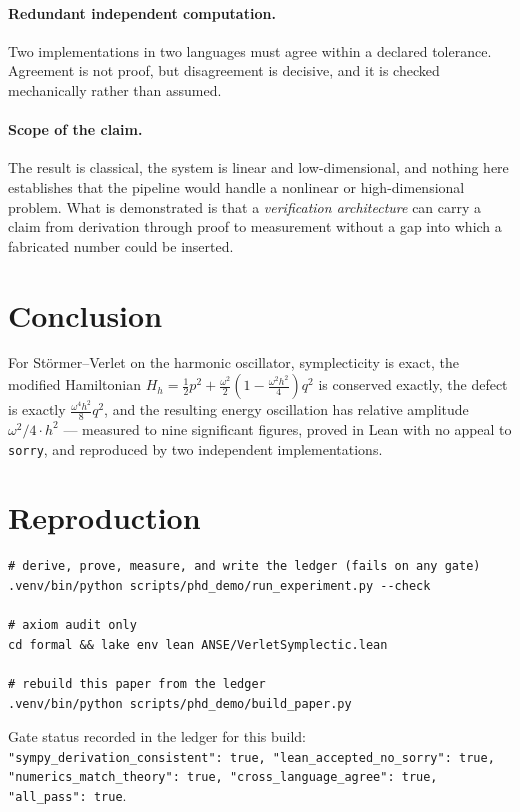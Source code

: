 \documentclass[11pt,a4paper]{article}
\begin{document}
\paragraph{Redundant independent computation.} Two implementations in two
languages must agree within a declared tolerance. Agreement is not proof, but
disagreement is decisive, and it is checked mechanically rather than assumed.

\paragraph{Scope of the claim.} The result is classical, the system is linear and
low-dimensional, and nothing here establishes that the pipeline would handle a
nonlinear or high-dimensional problem. What is demonstrated is that a
\emph{verification architecture} can carry a claim from derivation through proof to
measurement without a gap into which a fabricated number could be inserted.

\section{Conclusion}

For St\"ormer--Verlet on the harmonic oscillator, symplecticity is exact,
the modified Hamiltonian
$H_h=\tfrac12p^2+\tfrac{\omega^2}{2}(1-\tfrac{\omega^2h^2}{4})q^2$ is conserved
exactly, the defect is exactly $\tfrac{\omega^4h^2}{8}q^2$, and the resulting
energy oscillation has relative amplitude $\omega^2/4\cdot h^2$ --- measured to
nine significant figures, proved in Lean with no appeal to \texttt{sorry}, and
reproduced by two independent implementations.

\appendix
\section{Reproduction}

\begin{verbatim}
# derive, prove, measure, and write the ledger (fails on any gate)
.venv/bin/python scripts/phd_demo/run_experiment.py --check

# axiom audit only
cd formal && lake env lean ANSE/VerletSymplectic.lean

# rebuild this paper from the ledger
.venv/bin/python scripts/phd_demo/build_paper.py
\end{verbatim}

Gate status recorded in the ledger for this build:
\texttt{{"sympy\_derivation\_consistent": true, "lean\_accepted\_no\_sorry": true, "numerics\_match\_theory": true, "cross\_language\_agree": true, "all\_pass": true}}.
\end{document}
